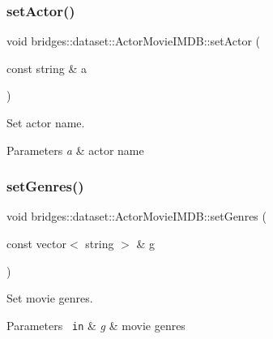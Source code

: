 \subsubsection{\texorpdfstring{setActor()}{setActor()}}
{\footnotesize\ttfamily void bridges\+::dataset\+::\+Actor\+Movie\+I\+M\+D\+B\+::set\+Actor (\begin{DoxyParamCaption}\item[{const string \&}]{a }\end{DoxyParamCaption})\hspace{0.3cm}{\ttfamily [inline]}}



Set actor name. 


\begin{DoxyParams}{Parameters}
{\em a} & actor name \\
\hline
\end{DoxyParams}
\mbox{\label{classbridges_1_1dataset_1_1_actor_movie_i_m_d_b_aee0f3b329a5fc11417d1d8922200f704}} 
\subsubsection{\texorpdfstring{setGenres()}{setGenres()}}
{\footnotesize\ttfamily void bridges\+::dataset\+::\+Actor\+Movie\+I\+M\+D\+B\+::set\+Genres (\begin{DoxyParamCaption}\item[{const vector$<$ string $>$ \&}]{g }\end{DoxyParamCaption})\hspace{0.3cm}{\ttfamily [inline]}}



Set movie genres. 


\begin{DoxyParams}[1]{Parameters}
\mbox{\texttt{ in}}  & {\em g} & movie genres \\
\hline
\end{DoxyParams}
\mbox{\label{classbridges_1_1dataset_1_1_actor_movie_i_m_d_b_adc95ee7566046ae60aedad96868d3ae4}} 
